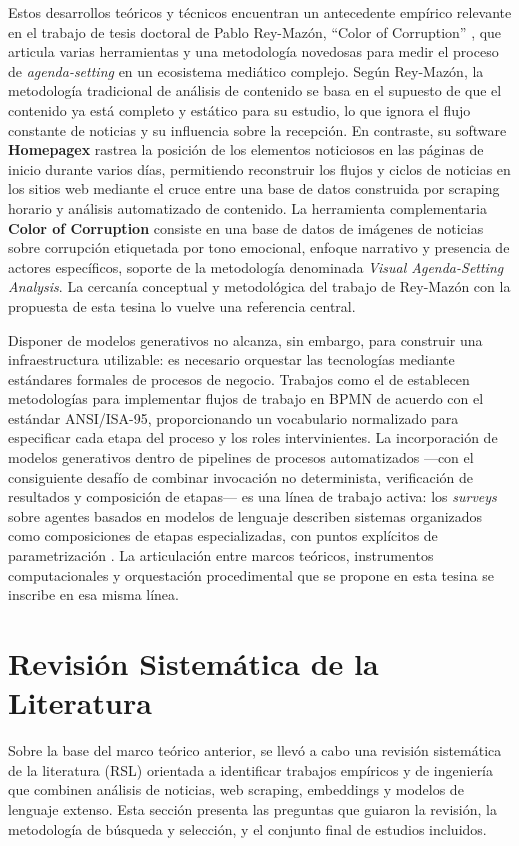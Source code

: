 \documentclass[12pt]{report}
\begin{document}
Estos desarrollos teóricos y técnicos encuentran un antecedente empírico relevante en el trabajo de tesis doctoral de Pablo Rey-Mazón, ``Color of Corruption'' \citep{mazon:2023}, que articula varias herramientas y una metodología novedosas para medir el proceso de \textit{agenda-setting} en un ecosistema mediático complejo. Según Rey-Mazón, la metodología tradicional de análisis de contenido se basa en el supuesto de que el contenido ya está completo y estático para su estudio, lo que ignora el flujo constante de noticias y su influencia sobre la recepción. En contraste, su software \textbf{Homepagex} rastrea la posición de los elementos noticiosos en las páginas de inicio durante varios días, permitiendo reconstruir los flujos y ciclos de noticias en los sitios web mediante el cruce entre una base de datos construida por scraping horario y análisis automatizado de contenido. La herramienta complementaria \textbf{Color of Corruption} consiste en una base de datos de imágenes de noticias sobre corrupción etiquetada por tono emocional, enfoque narrativo y presencia de actores específicos, soporte de la metodología denominada \textit{Visual Agenda-Setting Analysis}. La cercanía conceptual y metodológica del trabajo de Rey-Mazón con la propuesta de esta tesina lo vuelve una referencia central.

Disponer de modelos generativos no alcanza, sin embargo, para construir una infraestructura utilizable: es necesario orquestar las tecnologías mediante estándares formales de procesos de negocio. Trabajos como el de \citet{PRADES2013115} establecen metodologías para implementar flujos de trabajo en BPMN de acuerdo con el estándar ANSI/ISA-95, proporcionando un vocabulario normalizado para especificar cada etapa del proceso y los roles intervinientes. La incorporación de modelos generativos dentro de pipelines de procesos automatizados ---con el consiguiente desafío de combinar invocación no determinista, verificación de resultados y composición de etapas--- es una línea de trabajo activa: los \textit{surveys} sobre agentes basados en modelos de lenguaje describen sistemas organizados como composiciones de etapas especializadas, con puntos explícitos de parametrización \citep{wang:2024, xi:2023}. La articulación entre marcos teóricos, instrumentos computacionales y orquestación procedimental que se propone en esta tesina se inscribe en esa misma línea.

\section{Revisión Sistemática de la Literatura}
\label{sec:rsl}
Sobre la base del marco teórico anterior, se llevó a cabo una revisión sistemática de la literatura (RSL) orientada a identificar trabajos empíricos y de ingeniería que combinen análisis de noticias, web scraping, embeddings y modelos de lenguaje extenso. Esta sección presenta las preguntas que guiaron la revisión, la metodología de búsqueda y selección, y el conjunto final de estudios incluidos.
\end{document}
